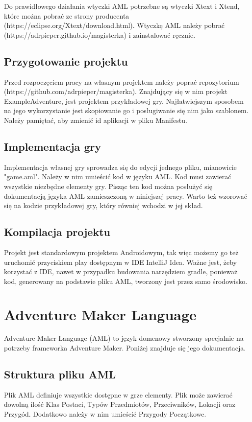 \documentclass	{xmgr}
\begin{document}
Do prawidłowego działania wtyczki AML potrzebne są wtyczki Xtext i Xtend, które można pobrać ze strony producenta (https://eclipse.org/Xtext/download.html).
Wtyczkę AML należy pobrać (https://adrpieper.github.io/magisterka) i zainstalować ręcznie.

\section{Przygotowanie projektu}
Przed rozpoczęciem pracy na własnym projektem należy poprać repozytorium (https://github.com/adrpieper/magisterka). Znajdujący się w nim projekt ExampleAdventure, jest projektem przykładowej gry. Najłatwiejszym sposobem na jego wykorzystanie jest skopiowanie go i posługiwanie się nim jako szablonem. Należy pamiętać, aby zmienić id aplikacji w pliku Manifestu.

\section{Implementacja gry}
Implementacja własnej gry sprowadza się do edycji jednego pliku, mianowicie "game.aml". Należy w nim umieścić kod w języku AML. Kod musi  zawierać wszystkie niezbędne elementy gry. Pisząc ten kod można posłużyć się dokumentacją języka AML zamieszczoną w niniejszej pracy. Warto też wzorować się na kodzie przykładowej gry, który równiej wchodzi w jej skład.

\section{Kompilacja projektu}
Projekt jest standardowym projektem Androidowym, tak więc możemy go też uruchomić przyciskiem play dostępnym w IDE IntelliJ Idea. Ważne jest, żeby korzystać z IDE, nawet w przypadku budowania narzędziem gradle, ponieważ kod, generowany na podstawie pliku AML, tworzony jest przez samo środowisko.

\chapter{Adventure Maker Language} 
Adventure Maker Language (AML) to język domenowy stworzony specjalnie na potrzeby frameworka Adventure Maker. Poniżej znajduje się jego dokumentacja.

\section{Struktura pliku AML} 
Plik AML definiuje wszystkie dostępne w grze elementy. Plik może zawierać dowolną ilość Klas Postaci, Typów Przedmiotów, Przeciwników, Lokacji oraz Przygód. Dodatkowo należy w nim umieścić Przygody Początkowe. 
\end{document}

